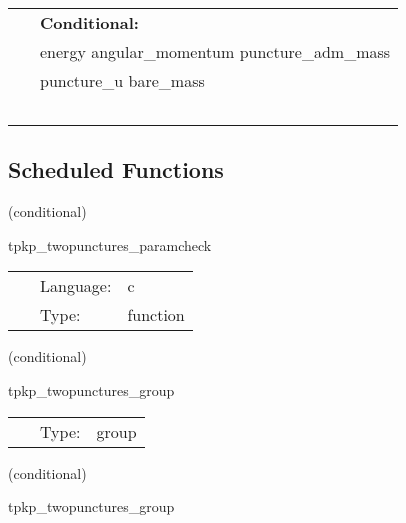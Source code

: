  \begin{tabular*}{160mm}{ll} 
~& {\bf Conditional:} \\ 
~ &  energy angular\_momentum puncture\_adm\_mass\\ 
~ &  puncture\_u bare\_mass\\ 
~ & ~\\ 
\end{tabular*} 


\subsection*{Scheduled Functions}
\vspace{5mm}

   (conditional) 

\hspace{5mm} tpkp\_twopunctures\_paramcheck 

\hspace{5mm}{\it check parameters and thorn needs } 


\hspace{5mm}

 \begin{tabular*}{160mm}{cll} 
~ & Language:  & c \\ 
~ & Type:  & function \\ 
\end{tabular*} 


\vspace{5mm}

   (conditional) 

\hspace{5mm} tpkp\_twopunctures\_group 

\hspace{5mm}{\it twopunctures initial data group } 


\hspace{5mm}

 \begin{tabular*}{160mm}{cll} 
~ & Type:  & group \\ 
\end{tabular*} 


\vspace{5mm}

   (conditional) 

\hspace{5mm} tpkp\_twopunctures\_group 

\hspace{5mm}{\it twopunctures initial data group } 


